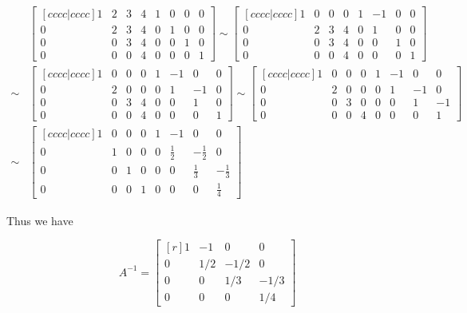 \documentclass[12pt]{article}
\begin{document}
{    \begin{align*}
      &\begin{bmatrix}[cccc|cccc]
        1 & 2 & 3 & 4 & 1 & 0 & 0 & 0 \\ 
        0 & 2 & 3 & 4 & 0 & 1 & 0 & 0 \\ 
        0 & 0 & 3 & 4 & 0 & 0 & 1 & 0 \\ 
        0 & 0 & 0 & 4 & 0 & 0 & 0 & 1
      \end{bmatrix}
      \sim
      \begin{bmatrix}[cccc|cccc]
        1 & 0 & 0 & 0 & 1 & -1 & 0 & 0 \\ 
        0 & 2 & 3 & 4 & 0 & 1 & 0 & 0 \\ 
        0 & 0 & 3 & 4 & 0 & 0 & 1 & 0 \\ 
        0 & 0 & 0 & 4 & 0 & 0 & 0 & 1
      \end{bmatrix} \\
      \sim
      &\begin{bmatrix}[cccc|cccc]
        1 & 0 & 0 & 0 & 1 & -1 & 0 & 0 \\ 
        0 & 2 & 0 & 0 & 0 & 1 & -1 & 0 \\ 
        0 & 0 & 3 & 4 & 0 & 0 & 1 & 0 \\ 
        0 & 0 & 0 & 4 & 0 & 0 & 0 & 1
      \end{bmatrix}
      \sim
      \begin{bmatrix}[cccc|cccc]
        1 & 0 & 0 & 0 & 1 & -1 & 0 & 0 \\ 
        0 & 2 & 0 & 0 & 0 & 1 & -1 & 0 \\ 
        0 & 0 & 3 & 0 & 0 & 0 & 1 & -1 \\ 
        0 & 0 & 0 & 4 & 0 & 0 & 0 & 1
      \end{bmatrix} \\
      \sim
      &\begin{bmatrix}[cccc|cccc]
        1 & 0 & 0 & 0 & 1 & -1 & 0 & 0 \\ 
        0 & 1 & 0 & 0 & 0 & \frac{1}{2} & -\frac{1}{2} & 0 \\ 
        0 & 0 & 1 & 0 & 0 & 0 & \frac{1}{3} & -\frac{1}{3} \\ 
        0 & 0 & 0 & 1 & 0 & 0 & 0 & \frac{1}{4}
      \end{bmatrix}
    \end{align*}

    Thus we have

    \[
      A^{-1} = \begin{bmatrix*}[r]
        1 & -1 & 0 & 0 \\ 
        0 & 1/2 & -1/2 & 0 \\ 
        0 & 0 & 1/3 & -1/3 \\ 
        0 & 0 & 0 & 1/4
      \end{bmatrix*}
    \]
  }
\end{document}
